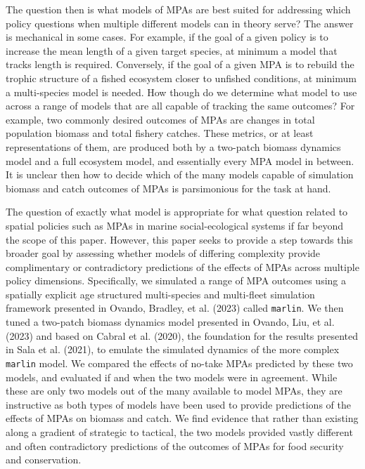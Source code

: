 \documentclass[
  default,
  lineno,
  referee]{sn-jnl}
\begin{document}
The question then is what models of MPAs are best suited for addressing
which policy questions when multiple different models can in theory
serve? The answer is mechanical in some cases. For example, if the goal
of a given policy is to increase the mean length of a given target
species, at minimum a model that tracks length is required. Conversely,
if the goal of a given MPA is to rebuild the trophic structure of a
fished ecosystem closer to unfished conditions, at minimum a
multi-species model is needed. How though do we determine what model to
use across a range of models that are all capable of tracking the same
outcomes? For example, two commonly desired outcomes of MPAs are changes
in total population biomass and total fishery catches. These metrics, or
at least representations of them, are produced both by a two-patch
biomass dynamics model and a full ecosystem model, and essentially every
MPA model in between. It is unclear then how to decide which of the many
models capable of simulation biomass and catch outcomes of MPAs is
parsimonious for the task at hand.

The question of exactly what model is appropriate for what question
related to spatial policies such as MPAs in marine social-ecological
systems if far beyond the scope of this paper. However, this paper seeks
to provide a step towards this broader goal by assessing whether models
of differing complexity provide complimentary or contradictory
predictions of the effects of MPAs across multiple policy dimensions.
Specifically, we simulated a range of MPA outcomes using a spatially
explicit age structured multi-species and multi-fleet simulation
framework presented in Ovando, Bradley, et al. (2023) called
\texttt{marlin}. We then tuned a two-patch biomass dynamics model
presented in Ovando, Liu, et al. (2023) and based on Cabral et al.
(2020), the foundation for the results presented in Sala et al. (2021),
to emulate the simulated dynamics of the more complex \texttt{marlin}
model. We compared the effects of no-take MPAs predicted by these two
models, and evaluated if and when the two models were in agreement.
While these are only two models out of the many available to model MPAs,
they are instructive as both types of models have been used to provide
predictions of the effects of MPAs on biomass and catch. We find
evidence that rather than existing along a gradient of strategic to
tactical, the two models provided vastly different and often
contradictory predictions of the outcomes of MPAs for food security and
conservation.
\end{document}
